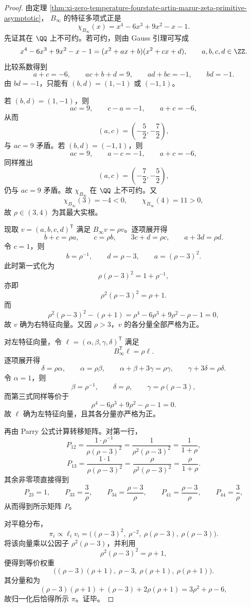 \begin{proof}
由定理 \ref{thm:xi-zero-temperature-fourstate-artin-mazur-zeta-primitive-asymptotic}，
\(B_\infty\) 的特征多项式正是
\[
\chi_{B_\infty}(x)=x^4-6x^3+9x^2-x-1.
\]
先证其在 \(\QQ\) 上不可约。若可约，则由 Gauss 引理可写成
\[
x^4-6x^3+9x^2-x-1=(x^2+ax+b)(x^2+cx+d),
\qquad a,b,c,d\in\ZZ.
\]
比较系数得到
\[
a+c=-6,\qquad ac+b+d=9,\qquad ad+bc=-1,\qquad bd=-1.
\]
由 \(bd=-1\)，只能有 \((b,d)=(1,-1)\) 或 \((-1,1)\)。

若 \((b,d)=(1,-1)\)，则
\[
ac=9,\qquad c-a=-1,\qquad a+c=-6,
\]
从而
\[
(a,c)=\left(-\frac52,-\frac72\right),
\]
与 \(ac=9\) 矛盾。若 \((b,d)=(-1,1)\)，则
\[
ac=9,\qquad a-c=-1,\qquad a+c=-6,
\]
同样推出
\[
(a,c)=\left(-\frac72,-\frac52\right),
\]
仍与 \(ac=9\) 矛盾。故 \(\chi_{B_\infty}\) 在 \(\QQ\) 上不可约。又
\[
\chi_{B_\infty}(3)=-4<0,
\qquad
\chi_{B_\infty}(4)=11>0,
\]
故 \(\rho\in(3,4)\) 为其最大实根。

现取 \(v=(a,b,c,d)^{\mathsf T}\) 满足 \(B_\infty v=\rho v\)。逐项展开得
\[
b+c=\rho a,\qquad c=\rho b,\qquad 3c+d=\rho c,\qquad a+3d=\rho d.
\]
令 \(c=1\)，则
\[
b=\rho^{-1},\qquad d=\rho-3,\qquad a=(\rho-3)^2.
\]
此时第一式化为
\[
\rho(\rho-3)^2=1+\rho^{-1},
\]
亦即
\[
\rho^2(\rho-3)^2=\rho+1.
\]
而
\[
\rho^2(\rho-3)^2-(\rho+1)
=
\rho^4-6\rho^3+9\rho^2-\rho-1
=
0,
\]
故 \(v\) 确为右特征向量。又因 \(\rho>3\)，\(v\) 的各分量全部严格为正。

对左特征向量，令 \(\ell=(\alpha,\beta,\gamma,\delta)^{\mathsf T}\) 满足
\[
B_\infty^{\mathsf T}\ell=\rho\ell.
\]
逐项展开得
\[
\delta=\rho\alpha,\qquad \alpha=\rho\beta,\qquad \alpha+\beta+3\gamma=\rho\gamma,\qquad \gamma+3\delta=\rho\delta.
\]
令 \(\alpha=1\)，则
\[
\beta=\rho^{-1},\qquad \delta=\rho,\qquad \gamma=\rho(\rho-3),
\]
而第三式同样等价于
\[
\rho^4-6\rho^3+9\rho^2-\rho-1=0.
\]
故 \(\ell\) 确为左特征向量，且其各分量亦严格为正。

再由 Parry 公式计算转移矩阵。对第一行，
\[
P_{12}
=
\frac{1\cdot \rho^{-1}}{\rho(\rho-3)^2}
=
\frac{1}{\rho^2(\rho-3)^2}
=
\frac{1}{1+\rho},
\]
\[
P_{13}
=
\frac{1\cdot 1}{\rho(\rho-3)^2}
=
\frac{\rho}{\rho^2(\rho-3)^2}
=
\frac{\rho}{1+\rho}.
\]
其余非零项直接得到
\[
P_{23}=1,\qquad
P_{33}=\frac{3}{\rho},\qquad
P_{34}=\frac{\rho-3}{\rho},\qquad
P_{41}=\frac{\rho-3}{\rho},\qquad
P_{44}=\frac{3}{\rho},
\]
从而得到所示矩阵 \(P\)。

对平稳分布，
\[
\pi_i\propto \ell_i v_i
=
\bigl((\rho-3)^2,\ \rho^{-2},\ \rho(\rho-3),\ \rho(\rho-3)\bigr).
\]
将该向量乘以公因子 \(\rho^2(\rho-3)\)，并利用
\[
\rho^2(\rho-3)^2=\rho+1,
\]
便得到等价权重
\[
\bigl((\rho-3)(\rho+1),\ \rho-3,\ \rho(\rho+1),\ \rho(\rho+1)\bigr).
\]
其分量和为
\[
(\rho-3)(\rho+1)+(\rho-3)+2\rho(\rho+1)=3\rho^2+\rho-6,
\]
故归一化后恰得所示 \(\pi\)。证毕。
\end{proof}


